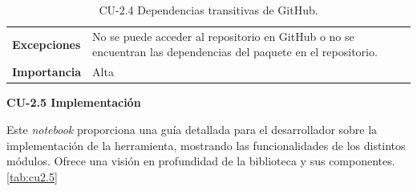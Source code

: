 \begin{table}[h!]
\begin{tabularx}{\linewidth}{ p{} p{} }
		\textbf{Excepciones}          & No se puede acceder al repositorio en GitHub o no se encuentran las dependencias del paquete en el repositorio.                                                            \\
		\textbf{Importancia}          & Alta                                                                                                                                                                       \\
		\bottomrule
	\end{tabularx}
	\caption{CU-2.4 Dependencias transitivas de GitHub.}
	\label{tab:cu2.4}
\end{table}


\textbf{CU-2.5 Implementación}

Este \textit{notebook} proporciona una guía detallada para el desarrollador sobre la implementación
de la herramienta, mostrando las funcionalidades de los distintos módulos. Ofrece una visión en
profundidad de la biblioteca y sus componentes.\ref{tab:cu2.5}

